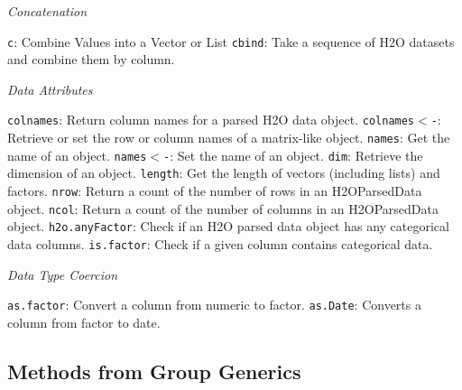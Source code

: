 \documentclass[11pt]{article}
\begin{document}
{\emph{Concatenation}\par
 {\texttt{c}}: Combine Values into a Vector or List\newline
 {\texttt{cbind}}: Take a sequence of H2O datasets and combine them by column.\par
{\emph{Data Attributes}}\par
{\texttt{colnames}}: Return column names for a parsed H2O data object. \newline
{\texttt{colnames$<$-}}: Retrieve or set the row or column names of a matrix-like object.\newline
{\texttt{names}}: Get the name of an object. \newline
{\texttt{names$<$-}}: Set the name of an object. \newline
{\texttt{dim}}: Retrieve the dimension of an object. \newline
{\texttt{length}}: Get the length of vectors (including lists) and factors. \newline
{\texttt{nrow}}: Return a count of the number of rows in an H2OParsedData object. \newline
{\texttt{ncol}}: Return a count of the number of columns in an H2OParsedData object.\newline
{\texttt{h2o.anyFactor}}: Check if an H2O parsed data object has any categorical data columns. \newline
{\texttt{is.factor}}: Check if a given column contains categorical data.\newline

{\emph{Data Type Coercion}}\par
{\texttt{as.factor}}: Convert a column from numeric to factor.\newline
{\texttt{as.Date}}: Converts a column from factor to date.\newline

\subsection{Methods from Group Generics}

}
\end{document}
